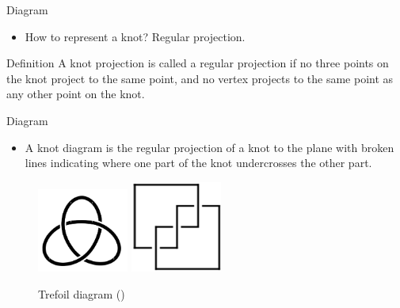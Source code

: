 \begin{frame}{Diagram}
	\begin{itemize}
		\item How to represent a knot? Regular projection.
	\end{itemize}
	\begin{kulblock}{Definition}
		A knot projection is called a regular projection if no three points on the knot project to the same point, and no vertex
		projects to the same point as any other point on the knot.
	\end{kulblock}
	
\end{frame}

\begin{frame}{Diagram}
	
	\begin{itemize}
		\item A knot diagram is the regular projection of a knot to the plane with broken
		lines indicating where one part of the knot undercrosses the other part.
	\end{itemize}
	\begin{figure}
		\centering
		\includegraphics[width=3cm]{Pictures/trefoil.png}
		\includegraphics[width=3cm]{Pictures/31.png}
		\caption{Trefoil diagram (\cite{trefoil})}
		\label{fig:enter-label}
	\end{figure}
\end{frame}

